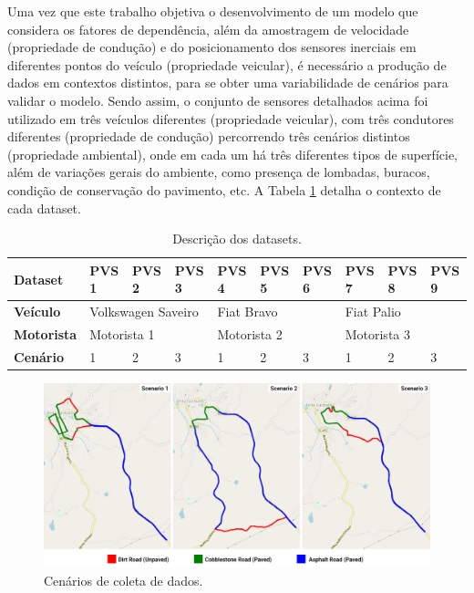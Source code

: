 Uma vez que este trabalho objetiva o desenvolvimento de um modelo que considera os fatores de dependência, além da amostragem de velocidade (propriedade de condução) e do posicionamento dos sensores inerciais em diferentes pontos do veículo (propriedade veicular), é necessário a produção de dados em contextos distintos, para se obter uma variabilidade de cenários para validar o modelo. Sendo assim, o conjunto de sensores detalhados acima foi utilizado em três veículos diferentes (propriedade veicular), com três condutores diferentes (propriedade de condução) percorrendo três cenários distintos (propriedade ambiental), onde em cada um há três diferentes tipos de superfície, além de variações gerais do ambiente, como presença de lombadas, buracos, condição de conservação do pavimento, etc. A Tabela \ref{table:datasets_description} detalha o contexto de cada dataset.

\begin{table}[h!]
\small
\caption{Descrição dos datasets.} 
\label{table:datasets_description}
\centering
\begin{tabular}{llllllllll}
\toprule
\textbf{Dataset} & PVS 1 & PVS 2 & PVS 3 & PVS 4 & PVS 5 & PVS 6 & PVS 7 & PVS 8 & PVS 9 
\\ \midrule
\textbf{Veículo} & 
\multicolumn{3}{l}{Volkswagen Saveiro} & 
\multicolumn{3}{l}{Fiat Bravo} & 
\multicolumn{3}{l}{Fiat Palio}
\\ \midrule
\textbf{Motorista} & 
\multicolumn{3}{l}{Motorista 1} & 
\multicolumn{3}{l}{Motorista 2} & 
\multicolumn{3}{l}{Motorista 3} 
\\ \midrule
\textbf{Cenário} & 1  & 2  & 3  & 1 & 2 & 3 & 1 & 2 & 3 
\\ \bottomrule
\end{tabular}
\end{table}

\begin{figure}[h!]
  \centering
  \includegraphics[width=1\textwidth]{figuras/scenarios.png}
  \caption{Cenários de coleta de dados.}
  \label{fig:data_collection_scenarios}
\end{figure}

